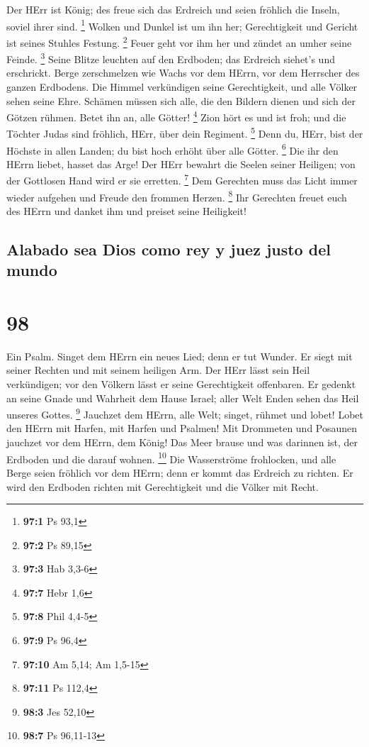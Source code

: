  Der HErr ist König; des freue sich das Erdreich und seien
fröhlich die Inseln, soviel ihrer sind. \footnote{\textbf{97:1} Ps 93,1}
 Wolken und Dunkel ist um ihn her; Gerechtigkeit und
Gericht ist seines Stuhles Festung. \footnote{\textbf{97:2} Ps 89,15}
 Feuer geht vor ihm her und zündet an umher seine Feinde.
\footnote{\textbf{97:3} Hab 3,3-6}  Seine Blitze leuchten
auf den Erdboden; das Erdreich siehet's und erschrickt. 
Berge zerschmelzen wie Wachs vor dem HErrn, vor dem Herrscher des ganzen
Erdbodens.  Die Himmel verkündigen seine Gerechtigkeit,
und alle Völker sehen seine Ehre.  Schämen müssen sich
alle, die den Bildern dienen und sich der Götzen rühmen. Betet ihn an,
alle Götter! \footnote{\textbf{97:7} Hebr 1,6}  Zion hört
es und ist froh; und die Töchter Judas sind fröhlich, HErr, über dein
Regiment. \footnote{\textbf{97:8} Phil 4,4-5}  Denn du,
HErr, bist der Höchste in allen Landen; du bist hoch erhöht über alle
Götter. \footnote{\textbf{97:9} Ps 96,4}  Die ihr den
HErrn liebet, hasset das Arge! Der HErr bewahrt die Seelen seiner
Heiligen; von der Gottlosen Hand wird er sie erretten. \footnote{\textbf{97:10}
  Am 5,14; Am 1,5-15}  Dem Gerechten muss das Licht immer
wieder aufgehen und Freude den frommen Herzen. \footnote{\textbf{97:11}
  Ps 112,4}  Ihr Gerechten freuet euch des HErrn und
danket ihm und preiset seine Heiligkeit!

\hypertarget{alabado-sea-dios-como-rey-y-juez-justo-del-mundo}{%
\subsection{Alabado sea Dios como rey y juez justo del
mundo}\label{alabado-sea-dios-como-rey-y-juez-justo-del-mundo}}

\hypertarget{section-97}{%
\section{98}\label{section-97}}

 Ein Psalm. Singet dem HErrn ein neues Lied; denn er tut
Wunder. Er siegt mit seiner Rechten und mit seinem heiligen Arm.
 Der HErr lässt sein Heil verkündigen; vor den Völkern
lässt er seine Gerechtigkeit offenbaren.  Er gedenkt an
seine Gnade und Wahrheit dem Hause Israel; aller Welt Enden sehen das
Heil unseres Gottes. \footnote{\textbf{98:3} Jes 52,10} 
Jauchzet dem HErrn, alle Welt; singet, rühmet und lobet! 
Lobet den HErrn mit Harfen, mit Harfen und Psalmen!  Mit
Drommeten und Posaunen jauchzet vor dem HErrn, dem König! 
Das Meer brause und was darinnen ist, der Erdboden und die darauf
wohnen. \footnote{\textbf{98:7} Ps 96,11-13}  Die
Wasserströme frohlocken, und alle Berge seien fröhlich 
vor dem HErrn; denn er kommt das Erdreich zu richten. Er wird den
Erdboden richten mit Gerechtigkeit und die Völker mit Recht.

